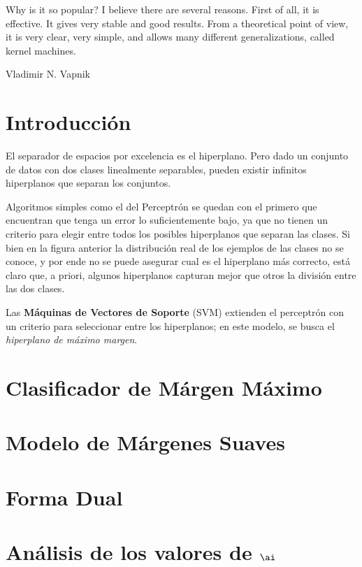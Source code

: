


\epigraph{Why is it so popular? I believe there are several reasons. First of all, it is effective. It gives very stable and good results. From a theoretical point of view, it is very clear, very simple, and allows many different generalizations, called kernel machines. }{Vladimir N. Vapnik}


\section{Introducción}
El separador de espacios por excelencia es el hiperplano. Pero dado un conjunto de datos con dos clases linealmente separables, pueden existir infinitos hiperplanos que separan los conjuntos. 


Algoritmos simples como el del Perceptrón se quedan con el primero que encuentran que tenga un error lo suficientemente bajo, ya que no tienen un criterio para elegir entre todos los posibles hiperplanos que separan las clases. Si bien en la figura anterior la distribución real de los ejemplos de las clases no se conoce, y por ende no se puede asegurar cual es el hiperplano más correcto, está claro que, a priori, algunos hiperplanos capturan mejor que otros la división entre las dos clases. 

Las \textbf{Máquinas de Vectores de Soporte} (SVM) extienden el perceptrón con un criterio para seleccionar entre los hiperplanos; en este modelo, se busca el \textit{hiperplano de máximo margen}.

\section{Clasificador de Márgen Máximo}

\section{Modelo de Márgenes Suaves}

\section{Forma Dual}

\section{Análisis de los valores de $\ai$}

